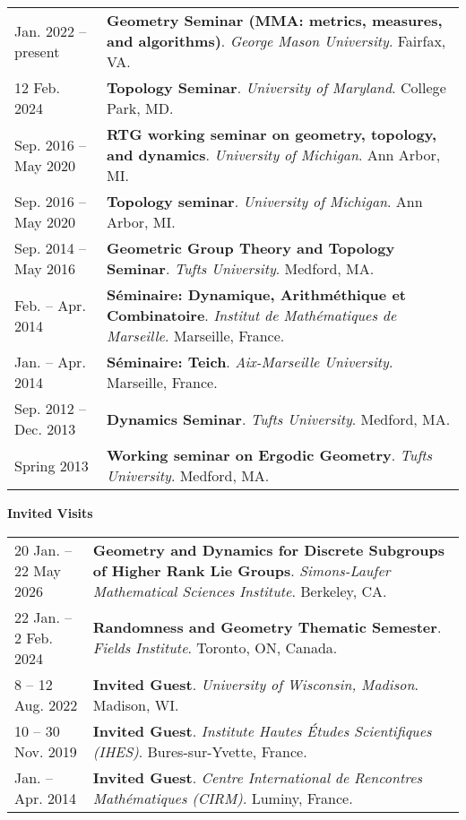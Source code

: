     \begin{center}
    {
    \renewcommand{\arraystretch}{1.5}
    \begin{longtable}{p{}  p{}}
     Jan.  2022 -- present & \textbf{Geometry Seminar (MMA: metrics, measures, and algorithms)}. \textit{George Mason University}.  Fairfax, VA.  \\ 
12 Feb.  2024 & \textbf{Topology Seminar}. \textit{University of Maryland}.  College Park, MD.  \\ 
 Sep.  2016 --  May  2020 & \textbf{RTG working seminar on geometry, topology, and dynamics}. \textit{University of Michigan}.  Ann Arbor, MI.  \\ 
 Sep.  2016 --  May  2020 & \textbf{Topology seminar}. \textit{University of Michigan}.  Ann Arbor, MI.  \\ 
 Sep.  2014 --  May  2016 & \textbf{Geometric Group Theory and Topology Seminar}. \textit{Tufts University}.  Medford, MA.  \\ 
 Feb.  --  Apr.  2014 & \textbf{S\'eminaire: Dynamique, Arithm\'ethique et Combinatoire}. \textit{Institut de Math\'ematiques de Marseille}.  Marseille, France.  \\ 
 Jan.  --  Apr.  2014 & \textbf{S\'eminaire: Teich}. \textit{Aix-Marseille University}.  Marseille, France.  \\ 
 Sep.  2012 --  Dec.  2013 & \textbf{Dynamics Seminar}. \textit{Tufts University}.  Medford, MA.  \\ 
  Spring 2013 & \textbf{Working seminar on Ergodic Geometry}. \textit{Tufts University}.  Medford, MA.  
    \end{longtable}
    } 
    \end{center}

    \vspace{-1em}
    

    \textbf{\large Invited Visits}
    
    \begin{center}
    {
    \renewcommand{\arraystretch}{1.5}
    \begin{longtable}{p{}  p{}}
    20 Jan.  -- 22 May  2026 & \textbf{Geometry and Dynamics for Discrete Subgroups of Higher Rank Lie Groups}. \textit{Simons-Laufer Mathematical Sciences Institute}.  Berkeley, CA.  \\ 
22 Jan.  -- 2 Feb.  2024 & \textbf{Randomness and Geometry Thematic Semester}. \textit{Fields Institute}.  Toronto, ON, Canada.  \\ 
8  -- 12 Aug.  2022 & \textbf{Invited Guest}. \textit{University of Wisconsin, Madison}.  Madison, WI.  \\ 
10  -- 30 Nov.  2019 & \textbf{Invited Guest}. \textit{Institute Hautes \'Etudes Scientifiques (IHES)}.  Bures-sur-Yvette, France.  \\ 
 Jan.  --  Apr.  2014 & \textbf{Invited Guest}. \textit{Centre International de Rencontres Math\'ematiques (CIRM)}.  Luminy, France.  
    \end{longtable}
    } 
    \end{center}

    \vspace{-1em}
    